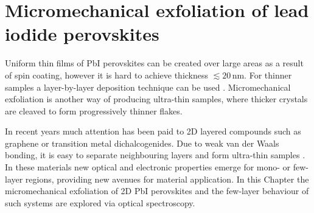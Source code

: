 
\chapter{Micromechanical exfoliation of lead iodide perovskites}

\graphicspath{{Chapter5/Figures/}}


Uniform thin films of PbI perovskites can be created over large areas as a result of spin coating, however it is hard to achieve thickness $\lesssim20$\,nm. For thinner samples a layer-by-layer deposition technique can be used \cite{Era2000, Matsui2002}. Micromechanical exfoliation is another way of producing ultra-thin samples, where thicker crystals are cleaved to form progressively thinner flakes.

In recent years much attention has been paid to 2D layered compounds such as graphene or transition metal dichalcogenides. Due to weak van der Waals bonding, it is easy to separate neighbouring layers and form ultra-thin samples \cite{Novoselov2004, Blake2007, Ni2007, Splendiani2010, Castellanos-Gomez2010, Tonndorf2013}. In these materials new optical and electronic properties emerge for mono- or few-layer regions, providing new avenues for material application. In this Chapter the micromechanical exfoliation of 2D PbI perovskites and the few-layer behaviour of such systems are explored via optical spectroscopy.

